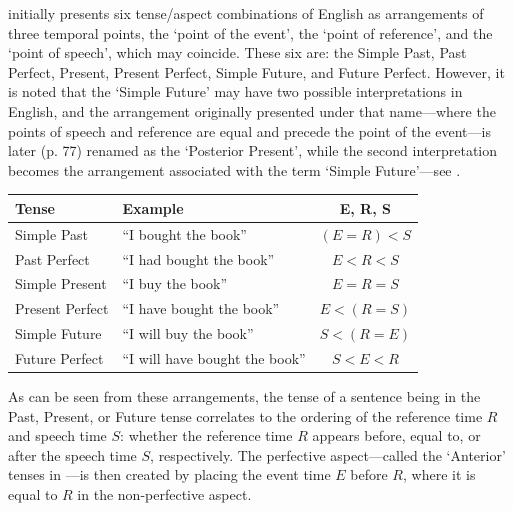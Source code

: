 \documentclass[a4paper,12pt,leqno]{article}
\begin{document}
\citet[p. 72]{reichenbach1947elements} initially presents six tense/aspect combinations of English as arrangements of three temporal points, the `point of the event', the `point of reference', and the `point of speech', which may coincide. These six are: the Simple Past, Past Perfect, Present, Present Perfect, Simple Future, and Future Perfect. However, it is noted that the `Simple Future' may have two possible interpretations in English, and the arrangement originally presented under that name---where the points of speech and reference are equal and precede the point of the event---is later (p. 77) renamed as the `Posterior Present', while the second interpretation becomes the arrangement associated with the term `Simple Future'---see .




\begin{center}
	\begin{tabular}{|l l c|}
		\hline
		\textbf{Tense} & \textbf{Example} & \textbf{E, R, S}\\
		\hline
		Simple Past & ``I bought the book'' & $(E = R) < S$\\
		Past Perfect & ``I had bought the book'' & $E < R < S$\\
		Simple Present & ``I buy the book'' & $E = R = S$\\
		Present Perfect & ``I have bought the book'' & $E < (R = S)$\\
		Simple Future & ``I will buy the book'' & $S < (R = E)$\\
		Future Perfect & ``I will have bought the book'' & $S < E < R$\\
		\hline
	\end{tabular}
	\label{fig:reichenbach-arrangements}
\end{center}
As can be seen from these arrangements, the tense of a sentence being in the Past, Present, or Future tense correlates to the ordering of the reference time $R$ and speech time $S$: whether the reference time $R$ appears before, equal to, or after the speech time $S$, respectively. The perfective aspect---called the `Anterior' tenses in \citet[p. 77]{reichenbach1947elements}---is then created by placing the event time $E$ before $R$, where it is equal to $R$ in the non-perfective aspect.
\end{document}

